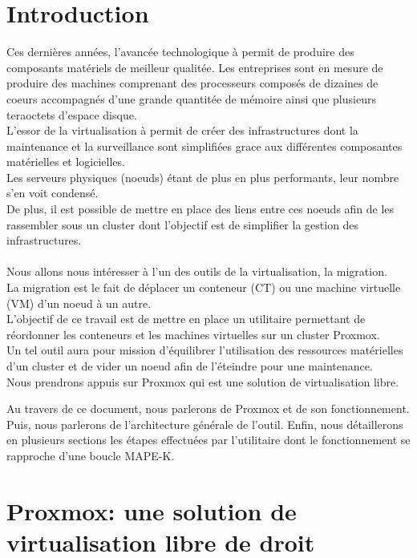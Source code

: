 \documentclass[14pt]{extarticle}
\begin{document}
\section*{Introduction}
    Ces dernières années, l'avancée technologique à permit de produire des composants matériels de meilleur qualitée. Les entreprises sont en mesure de produire des machines comprenant des processeurs composés de dizaines de coeurs accompagnés d'une grande quantitée de mémoire ainsi que plusieurs teraoctets d'espace disque.\\
    L'essor de la virtualisation à permit de créer des infrastructures dont la maintenance et la surveillance sont simplifiées grace aux différentes composantes matérielles et logicielles.\\
    Les serveurs physiques (noeuds) étant de plus en plus performants, leur nombre s'en voit condensé.\\
    De plus, il est possible de mettre en place des liens entre ces noeuds afin de les rassembler sous un cluster dont l'objectif est de simplifier la gestion des infrastructures.\\
    \\
    Nous allons nous intéresser à l'un des outils de la virtualisation, la migration.\\
    La migration est le fait de déplacer un conteneur (CT) ou une machine virtuelle (VM) d'un noeud à un autre.\\
    L'objectif de ce travail est de mettre en place un utilitaire permettant de réordonner les conteneurs et les machines virtuelles sur un cluster Proxmox.\\
    Un tel outil aura pour mission d'équilibrer l'utilisation des ressources matérielles d'un cluster et de vider un noeud afin de l'éteindre pour une maintenance.\\
    Nous prendrons appuis sur Proxmox qui est une solution de virtualisation libre.
    \newpage
    
    \noindent
    Au travers de ce document, nous parlerons de Proxmox et de son fonctionnement.\\
    Puis, nous parlerons de l'architecture générale de l'outil.
    Enfin, nous détaillerons en plusieurs sections les étapes effectuées par l'utilitaire dont le fonctionnement se rapproche d'une boucle MAPE-K.
    \newpage



\section{Proxmox: une solution de virtualisation libre de droit}
\end{document}
